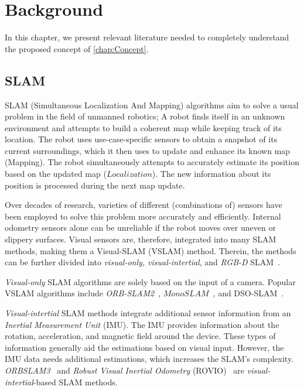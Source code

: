 \documentclass[main.tex]{subfiles}
\begin{document}
\chapter{Background}\label{chap:Background}
In this chapter, we present relevant literature needed to completely understand the proposed concept of \autoref{chap:Concept}.

\section{SLAM}
SLAM (Simultaneous Localization And Mapping) algorithms aim to solve a usual problem in the field of unmanned robotics;
A robot finds itself in an unknown environment and attempts to build a coherent map while keeping track of its location.
The robot uses use-case-specific sensors to obtain a snapshot of its current surroundings, which it then uses to update and enhance its known map (Mapping).
The robot simultaneously attempts to accurately estimate its position based on the updated map ($Localization$).
The new information about its position is processed during the next map update.

Over decades of research, varieties of different (combinations of) sensors have been employed to solve this problem more accurately and efficiently.
Internal odometry sensors alone can be unreliable if the robot moves over uneven or slippery surfaces.
Visual sensors are, therefore, integrated into many SLAM methods, making them a Visual-SLAM (VSLAM) method. Therein, the methods can be
further divided into \textit{visual-only, visual-intertial}, and \textit{RGB-D} SLAM~\cite{vslamsurvey}.

\textit{Visual-only} SLAM algorithms are solely based on the input of a camera.
Popular VSLAM algorithms include \textit{ORB-SLAM2}~\cite{Mur-Artal_Tardós_2017}, $MonoSLAM$~\cite{davison2007monoslam},
and DSO-SLAM~\cite{engel2017direct}.

\textit{Visual-intertial} SLAM methods integrate additional sensor information from an \textit{Inertial Measurement Unit} (IMU).
The IMU provides information about the rotation, acceleration, and magnetic field around the device. These types of information
generally aid the estimations based on visual input. However, the IMU data needs additional estimations,
which increases the SLAM's complexity. \textit{ORBSLAM3}~\cite{campos2021orb} and \textit{Robust Visual Inertial Odometry} (ROVIO)~\cite{bloesch2017iterated}
are \textit{visual-intertial}-based SLAM methods.
\end{document}
